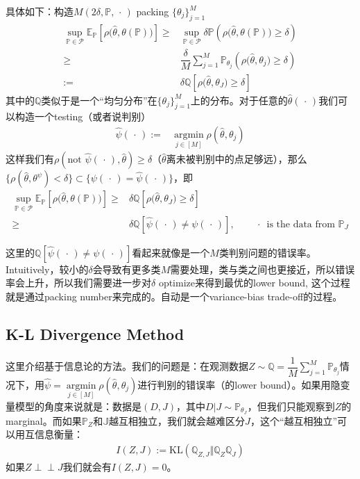 \documentclass[11pt,a4paper]{ctexart}
\numberwithin{equation}{section}%
\begin{document}
具体如下：构造$ M(2\delta , \mathbb{P}, \, \cdot \, ) $ packing $ \{\theta _j\}_{j=1}^M $
\begin{align*}
    \mathop{ \sup  }\limits_{\mathbb{P}\in \mathcal{P}}\mathbb{E}_\mathbb{P}\left[ \rho \bigl(\hat{\theta }, \theta (\mathbb{P})\bigr) \right]  \geq &  \mathop{ \sup  }\limits_{\mathbb{P}\in \mathcal{P}}\delta \mathbb{P}\left( \rho \bigl(\hat{\theta }, \theta (\mathbb{P})\bigr) \geq \delta  \right) \\
    \geq & \dfrac{ \delta  }{ M } \sum_{j=1}^M \mathbb{P}_{\theta _j}\left( \rho \bigl(\hat{\theta }, \theta_j \bigr) \geq \delta \right) \\
    :=& \delta \mathbb{Q}[ \rho \bigl(\hat{\theta }, \theta_J \bigr) \geq \delta  ]
\end{align*}
其中的$ \mathbb{Q} $类似于是一个“均匀分布”在$ \{\theta _j\}_{j=1}^M $上的分布。对于任意的$ \hat{\theta }(\, \cdot \, ) $我们可以构造一个testing（或者说判别）
\begin{align*}
     \hat{\psi}(\, \cdot \, ):= &\mathop{ \arg\min  }\limits_{j\in [M]} \rho (\hat{\theta }, \theta _j) 
\end{align*}
这样我们有$ \rho (\text{not }\hat{\psi}(\, \cdot \, ), \hat{\theta }) \geq \delta  $（$ \hat{\theta } $离未被判别中的点足够远），那么$ \{ \rho (\hat{\theta }, \theta^{\psi}) <\delta  \} \subset \{\psi(\, \cdot \, ) =  \hat{\psi}(\, \cdot \, ) \}$，即
\begin{align*}
    \mathop{ \sup  }\limits_{\mathbb{P}\in \mathcal{P}}\mathbb{E}_\mathbb{P}\left[ \rho \bigl(\hat{\theta }, \theta (\mathbb{P})\bigr) \right]  \geq & \delta \mathbb{Q}[ \rho \bigl(\hat{\theta }, \theta_J \bigr) \geq \delta  ]\\
    \geq &\delta  \mathbb{Q}[ \hat{\psi}(\, \cdot \, ) \neq \psi(\, \cdot \, ) ],\qquad \, \cdot \, \text{ is the data from }\mathbb{P}_J
\end{align*}

这里的$ \mathbb{Q}[ \hat{\psi}(\, \cdot \, ) \neq \psi(\, \cdot \, ) ] $看起来就像是一个$ M $类判别问题的错误率。Intuitively，较小的$ \delta  $会导致有更多类$ M $需要处理，类与类之间也更接近，所以错误率会上升，所以我们需要进一步对$ \delta  $ optimize来得到最优的lower bound, 这个过程就是通过packing number来完成的。自动是一个variance-bias trade-off的过程。

\subsection{K-L Divergence Method}
这里介绍基于信息论的方法。我们的问题是：在观测数据$ Z\sim \mathbb{Q}=\dfrac{ 1 }{ M } \sum_{j=1}^M \mathbb{P}_{\theta _j} $情况下，用$ \hat{\psi} = \mathop{ \arg\min  }\limits_{j\in[M]}\rho (\hat{\theta }, \theta _j)  $进行判别的错误率（的lower bound）。如果用隐变量模型的角度来说就是：数据是$ (D,J) $，其中$ D|J\sim \mathbb{P}_{\theta _J} $，但我们只能观察到$ Z $的marginal。而如果$ \mathbb{P}_{Z} $和$ \mathbb{J} $越互相独立，我们就会越难区分$ J $，这个“越互相独立”可以用互信息衡量：
\begin{align*}
    I(Z,J):= \mathrm{ KL }\left( \mathbb{Q}_{Z,J}\Vert \mathbb{Q}_Z\mathbb{Q}_J \right)  
\end{align*}
如果$ Z\perp \!\!\! \perp J $我们就会有$ I(Z,J)=0 $。
\end{document}
